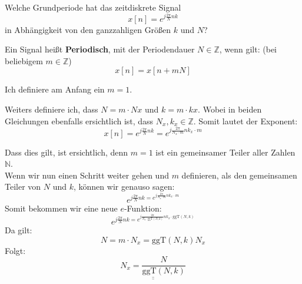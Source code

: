 \begin{uebsp}
\begin{Exercise}
    Welche Grundperiode hat das zeitdiskrete Signal
    \[x[n]=e^{j\frac{2\pi}{N}nk}\]
    in Abhängigkeit von den ganzzahligen Größen $k$ und $N$?
\end{Exercise}
\begin{Answer}
\begin{uebsp_theory}
    Ein Signal heißt \textbf{Periodisch}, mit der Periodendauer $N\in\mathbb{Z}$, wenn gilt: (bei beliebigem $m\in \mathbb{Z}$)
    \[x[n]=x[n+mN]\]
\end{uebsp_theory}

Ich definiere am Anfang ein $m = 1$.

Weiters definiere ich, dass $N = m\cdot Nx$ und $k = m\cdot kx$. Wobei in beiden Gleichungen ebenfalls ersichtlich ist, dass $N_x, k_x \in \mathbb{Z}$.
Somit lautet der Exponent:
\[x[n]=e^{j\frac{2\pi}{N}nk}=e^{j\frac{2\pi}{N_x\cdot m}nk_x\cdot m}\]

Dass dies gilt, ist ersichtlich, denn $m=1$ ist ein gemeinsamer Teiler aller Zahlen $\mathbb N$.\\

Wenn wir nun einen Schritt weiter gehen und $m$ definieren, als den gemeinsamen Teiler von $N$ und $k$, können wir genauso sagen:
\[e^{j\frac{2\pi}{N}nk=e^{j\frac{2\pi}{N_x\cdot m}nk_x\cdot m}}\]
Somit bekommen wir eine neue $e$-Funktion:
\[e^{j\frac{2\pi}{N}nk=e^{j\frac{2\pi}{N_x\cdot \text{ggT}(N,k)}nk_x\cdot \text{ggT}(N,k)}}\]
Da gilt:
\[N=m\cdot N_x=\text{ggT}(N,k)N_x\]
Folgt:
\[\underline{\underline{N_x=\frac{N}{\text{ggT}(N,k)}}}\]
\end{Answer}
\end{uebsp}

